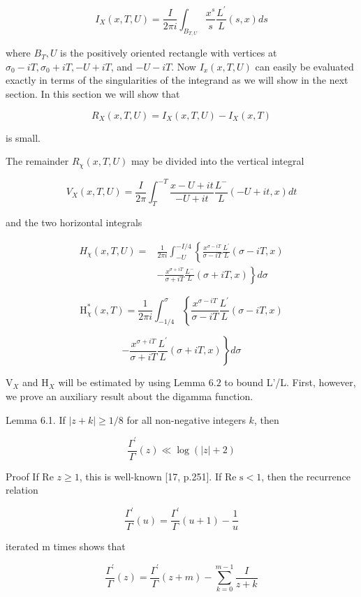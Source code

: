 $$
I_{X}(x, T, U)=\frac{I}{2 \pi i} \int_{B_{T, U}} \frac{x^{s}}{s} \frac{L^{\prime}}{L}(s, x) d s
$$

where $B_{T}, U$ is the positively oriented rectangle with vertices at $\sigma_{0}-i T, \sigma_{0}+i T,-U+i T$, and $-U-i T$. Now $I_{x}(x, T, U)$ can easily be evaluated exactly in terms of the singularities of the integrand as we will show in the next section. In this section we will show that

$$
R_{X}(x, T, U)=I_{X}(x, T, U)-I_{X}(x, T)
$$

is small.

The remainder $R_{\chi}(x, T, U)$ may be divided into the vertical integral

$$
V_{X}(x, T, U)=\frac{I}{2 \pi} \int_{T}^{-T} \frac{x-U+i t}{-U+i t} \frac{L^{-}}{L}(-U+i t, x) d t
$$

and the two horizontal integrals

$$
\begin{aligned}
H_{\chi}(x, T, U)=& \frac{1}{2 \pi i} \int_{-U}^{-I / 4}\left\{\frac{x^{\sigma-i T}}{\sigma-i T} \frac{L^{\prime}}{L}(\sigma-i T, x)\right.\\
&\left.-\frac{x^{\sigma+i T}}{\sigma+i T} \frac{L^{-}}{L}(\sigma+i T, x)\right\} d \sigma
\end{aligned}
$$

$$
\mathrm{H}_{\chi}^{*}(x, T)=\frac{1}{2 \pi i} \int_{-1 / 4}^{\sigma}\left\{\frac{x^{\sigma-i T}}{\sigma-i T} \frac{L^{\prime}}{L}(\sigma-i T, x)\right.
$$

$$
\left.-\frac{x^{\sigma+i T}}{\sigma+i T} \frac{L^{\prime}}{L}(\sigma+i T, x)\right\} d \sigma
$$

$\mathrm{V}_{X}$ and $\mathrm{H}_{X}$ will be estimated by using Lemma $6.2$ to bound L'/L. First, however, we prove an auxiliary result about the digamma function.

Lemma 6.1. If $|z+k| \geqslant 1 / 8$ for all non-negative integers $k$, then

$$
\frac{\Gamma^{\prime}}{\Gamma}(z) \ll \log (|z|+2)
$$

Proof If Re $z \geqslant 1$, this is well-known [17, p.251]. If Re $\mathrm{s}<1$, then the recurrence relation 

$$
\frac{\Gamma^{\prime}}{\Gamma}(u)=\frac{\Gamma^{\prime}}{\Gamma}(u+1)-\frac{1}{u}
$$

iterated m times shows that

$$
\frac{\Gamma^{\prime}}{\Gamma}(z)=\frac{\Gamma^{\prime}}{\Gamma}(z+m)-\sum_{k=0}^{m-1} \frac{I}{z+k}
$$

